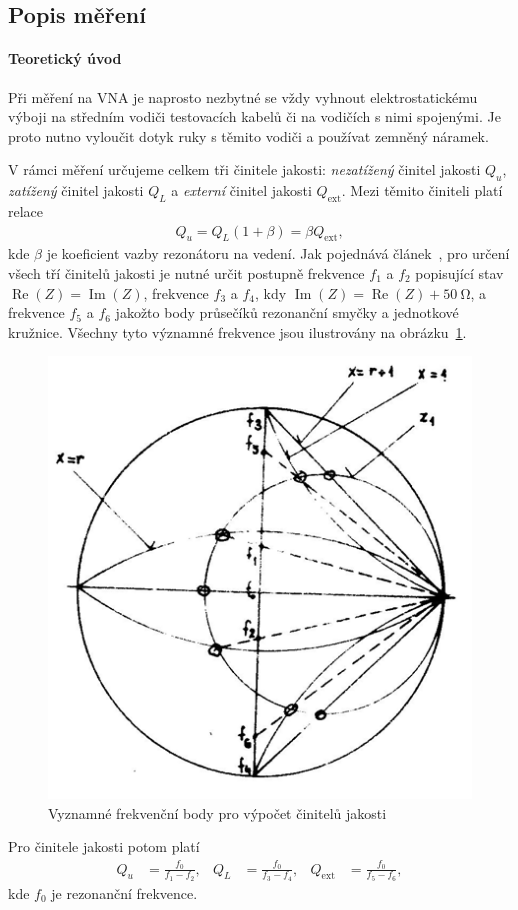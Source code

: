 \documentclass[11pt,a4paper]{article}
\renewcommand{\Re}{\operatorname{Re}}
\renewcommand{\Im}{\operatorname{Im}}
\newcommand{\Ohm}{\mathrm{\Omega}}
\begin{document}
\subsection*{Popis měření}
\paragraph*{Teoretický úvod} Při měření na VNA je naprosto nezbytné se vždy vyhnout elektrostatickému výboji na středním vodiči testovacích kabelů či na vodičích s nimi spojenými. Je proto nutno vyloučit dotyk ruky s těmito vodiči a používat zemněný náramek.

V rámci měření určujeme celkem tři činitele jakosti: \emph{nezatížený} činitel jakosti $Q_u$, \emph{zatížený} činitel jakosti $Q_L$ a \emph{externí} činitel jakosti $Q_{\mathrm{ext}}$. Mezi těmito činiteli platí relace
\begin{align*}
    Q_u = Q_L(1+\beta)=\beta Q_{\mathrm{ext}},
\end{align*}
kde $\beta$ je koeficient vazby rezonátoru na vedení. Jak pojednává článek~\cite{tysl:mereni-pri-velmi-vysokych-kmitoctech}, pro určení všech tří činitelů jakosti je nutné určit postupně frekvence $f_1$ a $f_2$ popisující stav $\Re(Z) = \Im(Z)$, frekvence $f_3$ a $f_4$, kdy $\Im(Z) = \Re(Z) + 50\ \Ohm$, a frekvence $f_5$ a $f_6$ jakožto body průsečíků rezonanční smyčky a jednotkové kružnice. Všechny tyto významné frekvence jsou ilustrovány na obrázku~\ref{fig:smitak-kruznice}.
\begin{figure}[!ht]
    \centering
    \includegraphics[width=.5\textwidth]{src/smitak-kruznice.png}
    \caption{\label{fig:smitak-kruznice}Vyznamné frekvenční body pro výpočet činitelů jakosti}
\end{figure}
Pro činitele jakosti potom platí
\begin{align}
    Q_u &= \frac{f_0}{f_1-f_2},
    &
    Q_L &= \frac{f_0}{f_3-f_4},
    &
    Q_{\mathrm{ext}} &= \frac{f_0}{f_5-f_6},
\end{align}
kde $f_0$ je rezonanční frekvence.
\end{document}
